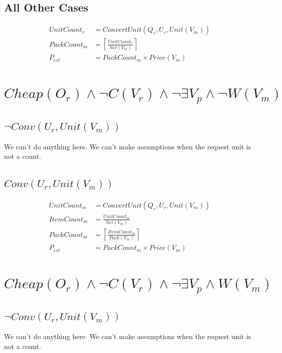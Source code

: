 \documentclass[11pt]{article}
\begin{document}
\subsection{All Other Cases}

\begin{align}
	UnitCount_r &= ConvertUnit(Q_r, U_r, Unit(V_m)) \\
	PackCount_m &= \left\lceil\frac{UnitCount_r}{Net(V_m)}\right\rceil\\
	P_{est} &= PackCount_m\times Price(V_m)
\end{align}

\section{$Cheap(O_r)\wedge\neg C(V_r)\wedge\neg\exists V_p\wedge\neg W(V_m)$}

\subsection{$\neg Conv(U_r, Unit(V_m))$}

We can't do anything here. We can't make assumptions when the request unit is not a count.

\subsection{$Conv(U_r, Unit(V_m))$}

\begin{align}
	UnitCount_m &= ConvertUnit(Q_r,U_r,Unit(V_m))\\
	ItemCount_m &= \frac{UnitCount_m}{Net(V_m)}\\
	PackCount_m &= \left\lceil\frac{ItemCount_m}{Pack(V_m)}\right\rceil\\
	P_{est} &= PackCount_m\times Price(V_m)
\end{align}

\section{$Cheap(O_r)\wedge\neg C(V_r)\wedge\neg\exists V_p\wedge W(V_m)$}

\subsection{$\neg Conv(U_r, Unit(V_m))$}

We can't do anything here. We can't make assumptions when the request unit is not a count.
\end{document}
